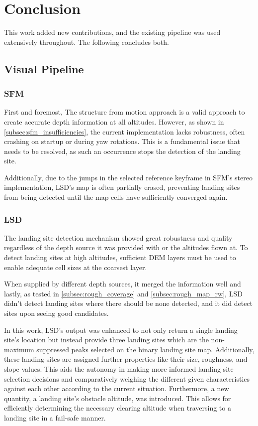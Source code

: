 \chapter{Conclusion}
\label{sec:conclusion}

This work added new contributions, and the existing pipeline was used extensively throughout. The following concludes both.
\section{Visual Pipeline}

\subsection{SFM}
First and foremost, The structure from motion approach is a valid approach to create accurate depth information at all altitudes. However, as shown in \cref{subsec:sfm_insufficiencies}, the current implementation lacks robustness, often crashing on startup or during yaw rotations. This is a fundamental issue that needs to be resolved, as such an occurrence stops the detection of the landing site.

Additionally, due to the jumps in the selected reference keyframe in SFM's stereo implementation, LSD's map is often partially erased, preventing landing sites from being detected until the map cells have sufficiently converged again.

\subsection{LSD}
The landing site detection mechanism showed great robustness and quality regardless of the depth source it was provided with or the altitudes flown at. To detect landing sites at high altitudes, sufficient DEM layers must be used to enable adequate cell sizes at the coarsest layer.

When supplied by different depth sources, it merged the information well and lastly, as tested in \cref{subsec:rough_coverage} and \cref{subsec:rough_map_rw}, LSD didn't detect landing sites where there should be none detected, and it did detect sites upon seeing good candidates.

In this work, LSD's output was enhanced to not only return a single landing site's location but instead provide three landing sites which are the non-maximum suppressed peaks selected on the binary landing site map. Additionally, these landing sites are assigned further properties like their size, roughness, and slope values. This aids the autonomy in making more informed landing site selection decisions and comparatively weighing the different given characteristics against each other according to the current situation. Furthermore, a new quantity, a landing site's obstacle altitude, was introduced. This allows for efficiently determining the necessary clearing altitude when traversing to a landing site in a fail-safe manner.

